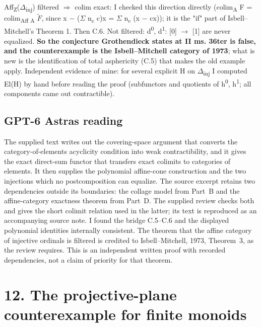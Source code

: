 Aff\textsubscript{Z}(\ensuremath{\Delta}\textsubscript{inj}) filtered \ensuremath{\Rightarrow} colim exact: I checked this direction directly (colim\textsubscript{A} F = colim\textsubscript{Aff A} \ensuremath{\widetilde{F}}, since x \ensuremath{-} (\ensuremath{\Sigma} n\textsubscript{c} c)x = \ensuremath{\Sigma} n\textsubscript{c} (x \ensuremath{-} cx)); it is the "if" part of Isbell--Mitchell's Theorem 1. Then C.6. Not filtered: d\textsuperscript{0}, d\textsuperscript{1}: [0] \ensuremath{\to} [1] are never equalized. \textbf{So the conjecture Grothendieck states at II ms. 36ter is false, and the counterexample is the Isbell--Mitchell category of 1973}; what is new is the identification of total asphericity (C.5) that makes the old example apply. Independent evidence of mine: for several explicit H on \ensuremath{\Delta}\textsubscript{inj} I computed El(H) by hand before reading the proof (subfunctors and quotients of h\textsuperscript{0}, h\textsuperscript{1}; all components came out contractible).


\subsection*{GPT-6 Astra\textquotesingle s reading}

The supplied text writes out the covering-space argument that converts the category-of-elements acyclicity condition into weak contractibility, and it gives the exact direct-sum functor that transfers exact colimits to categories of elements. It then supplies the polynomial affine-cone construction and the two injections which no postcomposition can equalize. The source excerpt retains two dependencies outside its boundaries: the collage model from Part~B and the affine-category exactness theorem from Part~D. The supplied review checks both and gives the short colimit relation used in the latter; its text is reproduced as an accompanying source note. I found the bridge C.5--C.6 and the displayed polynomial identities internally consistent. The theorem that the affine category of injective ordinals is filtered is credited to Isbell--Mitchell, 1973, Theorem~3, as the review requires. This is an independent written proof with recorded dependencies, not a claim of priority for that theorem.

\par\bigskip

\section*{12. The projective-plane counterexample for finite monoids}

